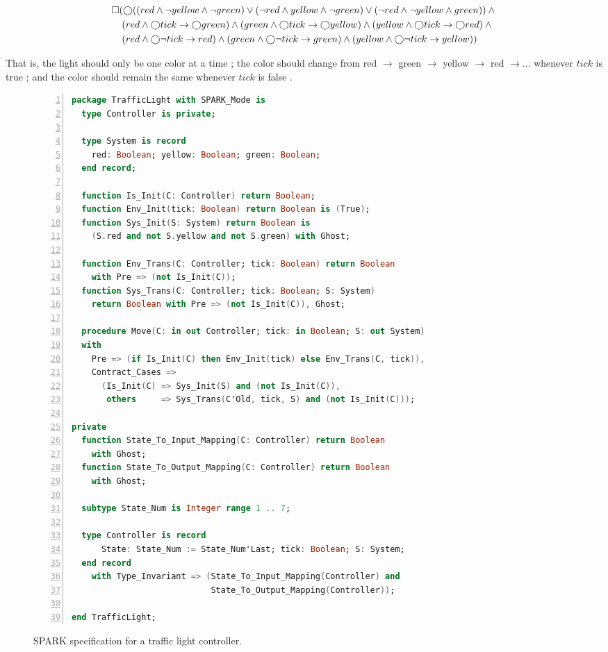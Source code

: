 \documentclass[runningheads]{llncs}
\begin{document}
{\scriptsize
\begin{align}
\square & (\varbigcirc ( (red \land \lnot yellow \land \lnot green) \lor (\lnot red \land yellow \land \lnot green) \lor (\lnot red \land \lnot yellow \land green)) \land \mbox{}  \label{eq:mutex} \\
	& \; (red \land \varbigcirc tick \rightarrow \varbigcirc green) \land (green \land \varbigcirc tick \rightarrow \varbigcirc yellow) \land (yellow \land \varbigcirc tick \rightarrow \varbigcirc red) \land \mbox{}  \label{eq:change} \\
	& \; (red \land \varbigcirc \lnot tick \rightarrow red) \land (green \land \varbigcirc \lnot tick \rightarrow green) \land (yellow \land \varbigcirc \lnot tick \rightarrow yellow) \label{eq:same})
\end{align}
}

\noindent That is, the light should only be one color at a time ; 
the color should change from red $\rightarrow$ green $\rightarrow$ yellow $\rightarrow$ red $\rightarrow \ldots$ whenever $tick$ is true ; 
and the color should remain the same whenever $tick$ is false .

\renewcommand{\floatpagefraction}{.8}%

\begin{figure}
\begin{lstlisting}[language={Ada}, basicstyle=\scriptsize, numbers=left]
package TrafficLight with SPARK_Mode is
  type Controller is private;
  
  type System is record
    red: Boolean; yellow: Boolean; green: Boolean;
  end record;
  
  function Is_Init(C: Controller) return Boolean;
  function Env_Init(tick: Boolean) return Boolean is (True);
  function Sys_Init(S: System) return Boolean is 
    (S.red and not S.yellow and not S.green) with Ghost;
    
  function Env_Trans(C: Controller; tick: Boolean) return Boolean
    with Pre => (not Is_Init(C));
  function Sys_Trans(C: Controller; tick: Boolean; S: System) 
    return Boolean with Pre => (not Is_Init(C)), Ghost;
    
  procedure Move(C: in out Controller; tick: in Boolean; S: out System)
  with 
    Pre => (if Is_Init(C) then Env_Init(tick) else Env_Trans(C, tick)),
    Contract_Cases =>
      (Is_Init(C) => Sys_Init(S) and (not Is_Init(C)),
       others     => Sys_Trans(C'Old, tick, S) and (not Is_Init(C)));

private
  function State_To_Input_Mapping(C: Controller) return Boolean
    with Ghost;
  function State_To_Output_Mapping(C: Controller) return Boolean
    with Ghost;
  
  subtype State_Num is Integer range 1 .. 7;
  
  type Controller is record
      State: State_Num := State_Num'Last; tick: Boolean; S: System;
  end record
    with Type_Invariant => (State_To_Input_Mapping(Controller) and 
                            State_To_Output_Mapping(Controller));
      
end TrafficLight;
\end{lstlisting}
  \caption{SPARK specification for a traffic light controller.}
  \label{fig:trafficLightSpec}
\end{figure}
\end{document}
